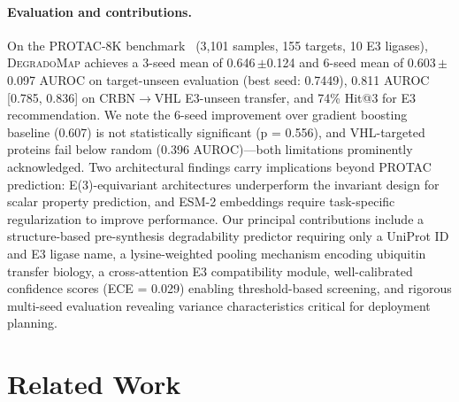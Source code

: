 \documentclass[sigconf]{acmart}
\newcommand{\ours}{\textsc{DegradoMap}}
\newcommand{\ci}[2]{{\small[#1, #2]}}
\newcommand{\spm}[1]{{\scriptsize$\pm$#1}}
\begin{document}
\paragraph{Evaluation and contributions.}
On the PROTAC-8K benchmark~\cite{liu2025degrademaster} (3,101 samples, 155 targets, 10 E3 ligases), \ours{} achieves a 3-seed mean of 0.646\,\spm{0.124} and 6-seed mean of 0.603\,\spm{0.097} AUROC on target-unseen evaluation (best seed: 0.7449), 0.811 AUROC \ci{0.785}{0.836} on CRBN$\to$VHL E3-unseen transfer, and 74\% Hit@3 for E3 recommendation.
We note the 6-seed improvement over gradient boosting baseline (0.607) is not statistically significant (p = 0.556), and VHL-targeted proteins fail below random (0.396 AUROC)---both limitations prominently acknowledged.
Two architectural findings carry implications beyond PROTAC prediction: E(3)-equivariant architectures underperform the invariant design for scalar property prediction, and ESM-2 embeddings require task-specific regularization to improve performance.
Our principal contributions include a structure-based pre-synthesis degradability predictor requiring only a UniProt ID and E3 ligase name, a lysine-weighted pooling mechanism encoding ubiquitin transfer biology, a cross-attention E3 compatibility module, well-calibrated confidence scores (ECE = 0.029) enabling threshold-based screening, and rigorous multi-seed evaluation revealing variance characteristics critical for deployment planning.



\section{Related Work}
\end{document}
